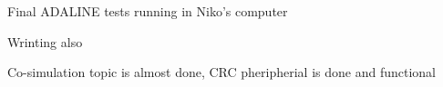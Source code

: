 


Final ADALINE tests running in Niko's computer

Wrinting also

Co-simulation topic is almost done, CRC pheripherial is done and functional
